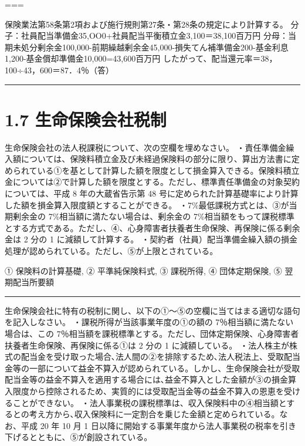 \documentclass[report,gutter=10mm,fore-edge=10mm,uplatex,dvipdfmx]{jlreq}
\begin{document}
===


保険業法第58条第2項および施行規則第27条・第28条の規定により計算する。
分子：社員配当準備金35,OO0+社員配当平衡積立金3,100＝38,100百万円
分母：当期未処分剰余金100,000-前期繰越剰余金45,000-損失てん補準備金200-基金利息1,200-基金償却準備金10,000=43,600百万円
したがって、配当還元率＝38，100÷43，600＝87．4％（答）

\begin{center}\rule{0.5\linewidth}{0.5pt}\end{center}

\section{1.7
生命保険会社税制}


生命保険会社の法人税課税について、次の空欄を埋めなさい。
・責任準備金繰入額については、保険料積立金及び未経過保険料の部分に限り、算出方法書に定められている①を基として計算した額を限度として損金算入できる。保険料積立金については②で計算した額を限度とする。ただし、標準責任準備金の対象契約については、平成
8 年の大蔵省告示第 48
号に定められた計算基礎率により計算した額を損金算入限度額とすることができる。
・7\%最低課税方式とは、③が当期剰余金の
7\%相当額に満たない場合は、剰余金の
7\%相当額をもって課税標準とする方式である。ただし、④、心身障害者扶養者生命保険、再保険に係る剰余金は
2 分の 1 に減額して計算する。
・契約者（社員）配当準備金繰入額の損金処理が認められている。ただし、⑤が上限とされている。


① 保険料の計算基礎, ② 平準純保険料式, ③ 課税所得, ④ 団体定期保険, ⑤
翌期配当所要額

\begin{center}\rule{0.5\linewidth}{0.5pt}\end{center}


生命保険会社に特有の税制に関し、以下の①～⑤の空欄に当てはまる適切な語句を記入しなさい。
・課税所得が当該事業年度の①の額の 7％相当額に満たない場合は、この
7％相当額を課税標準とする。ただし、団体定期保険、心身障害者扶養者生命保険、再保険に係る①は
2 分の 1 に減額している。
・法人株主が株式の配当金を受け取った場合､法人間の②を排除するため､法人税法上、受取配当金等の一部について益金不算入が認められている。しかし、生命保険会社が受取配当金等の益金不算入を適用する場合には､益金不算入とした金額が③の損金算入限度から控除されるため、実質的には受取配当金等の益金不算入の恩恵を受けることができない。
・法人事業税の課税標準は、収入保険料中の④相当額とするとの考え方から､収入保険料に一定割合を乗じた金額と定められている。なお、平成
20 年 10 月 1
日以降に開始する事業年度から法人事業税の税率を引き下げるとともに、⑤が創設されている。
\end{document}
